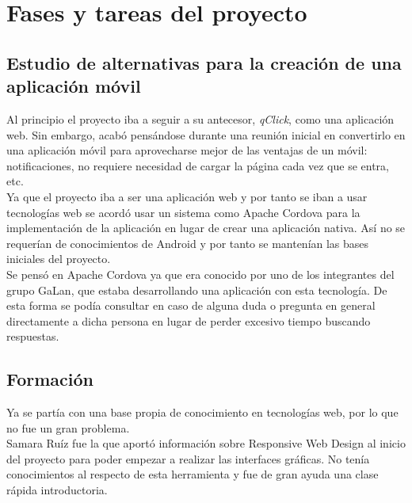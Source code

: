 
\section{Fases y tareas del proyecto}

\subsection{Estudio de alternativas para la creación de una aplicación móvil}

Al principio el proyecto iba a seguir a su antecesor, \textit{qClick}, como una aplicación web. Sin embargo, acabó pensándose durante una reunión inicial en convertirlo en una aplicación móvil para aprovecharse mejor de las ventajas de un móvil: notificaciones, no requiere necesidad de cargar la página cada vez que se entra, etc.\\

Ya que el proyecto iba a ser una aplicación web y por tanto se iban a usar tecnologías web se acordó usar un sistema como Apache Cordova para la implementación de la aplicación en lugar de crear una aplicación nativa. Así no se requerían de conocimientos de Android y por tanto se mantenían las bases iniciales del proyecto.\\

Se pensó en Apache Cordova ya que era conocido por uno de los integrantes del grupo GaLan, que estaba desarrollando una aplicación con esta tecnología. De esta forma se podía consultar en caso de alguna duda o pregunta en general directamente a dicha persona en lugar de perder excesivo tiempo buscando respuestas.\\

\subsection{Formación}

Ya se partía con una base propia de conocimiento en tecnologías web, por lo que no fue un gran problema.\\

Samara Ruíz fue la que aportó información sobre Responsive Web Design al inicio del proyecto para poder empezar a realizar las interfaces gráficas. No tenía conocimientos al respecto de esta herramienta y fue de gran ayuda una clase rápida introductoria.\\

